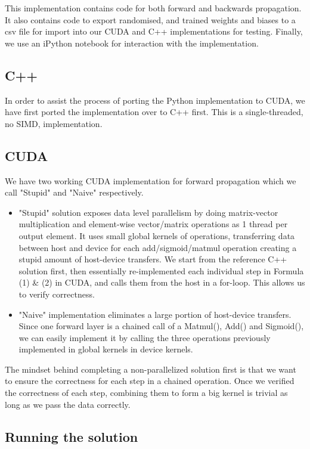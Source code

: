 \documentclass[sigconf,authorversion,nonacm]{acmart}
\begin{document}
This implementation contains code for both forward and backwards propagation. It also contains code to export randomised, and trained weights and biases to a csv file for import into our CUDA and C++ implementations for testing. Finally, we use an iPython notebook for interaction with the implementation.

\subsection{C++}
In order to assist the process of porting the Python implementation to CUDA, we have first ported the implementation over to C++ first. This is a single-threaded, no SIMD, implementation.

\subsection{CUDA}

We have two working CUDA implementation for forward propagation which we call "Stupid" and "Naive" respectively. 
\begin{itemize}
    \item "Stupid" solution exposes data level parallelism by doing matrix-vector multiplication and element-wise vector/matrix operations as 1 thread per output element. It uses small global kernels of operations, transferring data between host and device for each add/sigmoid/matmul operation creating a stupid amount of host-device transfers. We start from the reference C++ solution first, then essentially re-implemented each individual step in Formula (1) \& (2) in CUDA, and calls them from the host in a for-loop. This allows us to verify correctness.
    \item "Naive" implementation eliminates a large portion of host-device transfers. Since one forward layer is a chained call of a Matmul(), Add() and Sigmoid(), we can easily implement it by calling the three operations previously implemented in global kernels in device kernels.
\end{itemize}


The mindset behind completing a non-parallelized solution first is that we want to ensure the correctness for each step in a chained operation. Once we verified the correctness of each step, combining them to form a big kernel is trivial as long as we pass the data correctly. 

\subsection{Running the solution}
\end{document}
